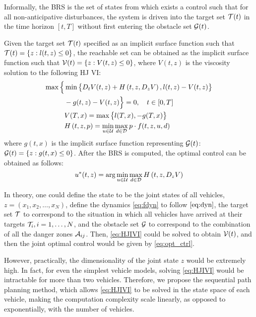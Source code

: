 Informally, the BRS is the set of states from which exists a control such that for all non-anticipative disturbances, the system is driven into the target set $\mathcal{T}(t)$ in the time horizon $[t, T]$ without first entering the obstacle set $\mathcal{G}(t)$.

Given the target set $\mathcal{T}(t)$ specified as an implicit surface function such that $\mathcal{T}(t) = \{z: l(t, z) \le 0\}$, the reachable set can be obtained as the implicit surface function such that $\mathcal{V}(t) = \{z: V(t, z) \le 0\}$, where $V(t, z)$ is the viscosity solution \cite{Crandall83} to the following HJ VI:
%
\begin{equation}
\label{eq:HJIVI}
\begin{aligned}
\max\Big\{&\min\big\{D_t V(t, z) + H\left(t, z, D_z V\right), l(t,z) - V(t, z)\big\}\\
& -g(t, z) - V(t, z)\Big\} = 0, \quad t\in[0,T]\\
&V(T, x) = \max\big\{l(T, x), -g(T, x)\big\} \\
&H\left(t, z, p\right) = \min_{u \in \mathcal{U}} \max_{d \in \mathcal{D}} p \cdot f(t, z, u, d)
\end{aligned}
\end{equation}
%
\noindent where $g(t, x)$ is the implicit surface function representing $\mathcal{G}(t)$: $\mathcal{G}(t) = \{z: g(t, x) \le 0\}$. After the BRS is computed, the optimal control can be obtained as follows:
%
\begin{equation}
\label{eq:opt_ctrl}
u^*(t, z) = \arg \min_{u \in \mathcal{U}} \max_{d \in \mathcal{D}} H\left(t, z, D_z V\right)
\end{equation}

In theory, one could define the state to be the joint states of all vehicles, $z = (x_1, x_2, \ldots, x_N)$, define the dynamics \eqref{eq:fdyn} to follow $\eqref{eq:dyn}$, the target set $\mathcal{T}$ to correspond to the situation in which all vehicles have arrived at their targets $\mathcal{T}_i, i = 1, \ldots, N$, and the obstacle set $\mathcal{G}$ to correspond to the combination of all the danger zones $\mathcal{A}_{ij}$. Then, \eqref{eq:HJIVI} could be solved to obtain $\mathcal{V}(t)$, and then the joint optimal control would be given by \eqref{eq:opt_ctrl}.

However, practically, the dimensionality of the joint state $z$ would be extremely high. In fact, for even the simplest vehicle models, solving \eqref{eq:HJIVI} would be intractable for more than two vehicles. Therefore, we propose the sequential path planning method, which allows \eqref{eq:HJIVI} to be solved in the state space of each vehicle, making the computation complexity scale linearly, as opposed to exponentially, with the number of vehicles.

